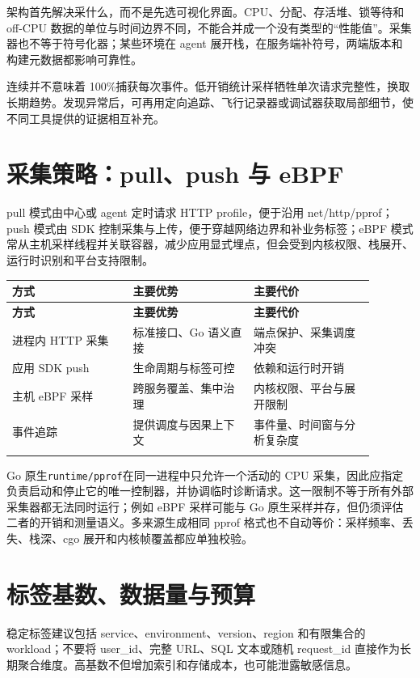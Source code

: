 \documentclass[UTF8,fontset=fandol,openany,11pt]{ctexbook}
\begin{document}
架构首先解决采什么，而不是先选可视化界面。CPU、分配、存活堆、锁等待和 off-CPU 数据的单位与时间边界不同，不能合并成一个没有类型的“性能值”。采集器也不等于符号化器；某些环境在 agent 展开栈，在服务端补符号，两端版本和构建元数据都影响可靠性。

连续并不意味着 100\%捕获每次事件。低开销统计采样牺牲单次请求完整性，换取长期趋势。发现异常后，可再用定向追踪、飞行记录器或调试器获取局部细节，使不同工具提供的证据相互补充。

\section{采集策略：pull、push 与 eBPF}
pull 模式由中心或 agent 定时请求 HTTP profile，便于沿用 net/http/pprof；push 模式由 SDK 控制采集与上传，便于穿越网络边界和补业务标签；eBPF 模式常从主机采样线程并关联容器，减少应用显式埋点，但会受到内核权限、栈展开、运行时识别和平台支持限制。

\begingroup\small\setlength{\tabcolsep}{4pt}
\begin{longtable}{>{\raggedright\arraybackslash}p{0.298\linewidth}>{\raggedright\arraybackslash}p{0.298\linewidth}>{\raggedright\arraybackslash}p{0.298\linewidth}}
\toprule
\textbf{方式} & \textbf{主要优势} & \textbf{主要代价} \\
\midrule
\endfirsthead
\toprule
\textbf{方式} & \textbf{主要优势} & \textbf{主要代价} \\
\midrule
\endhead
进程内 HTTP 采集 & 标准接口、Go 语义直接 & 端点保护、采集调度冲突 \\
\addlinespace[3pt]
应用 SDK push & 生命周期与标签可控 & 依赖和运行时开销 \\
\addlinespace[3pt]
主机 eBPF 采样 & 跨服务覆盖、集中治理 & 内核权限、平台与展开限制 \\
\addlinespace[3pt]
事件追踪 & 提供调度与因果上下文 & 事件量、时间窗与分析复杂度 \\
\addlinespace[3pt]
\bottomrule
\end{longtable}
\endgroup
Go 原生\texttt{runtime/\allowbreak{}pprof}在同一进程中只允许一个活动的 CPU 采集，因此应指定负责启动和停止它的唯一控制器，并协调临时诊断请求。这一限制不等于所有外部采集器都无法同时运行；例如 eBPF 采样可能与 Go 原生采样并存，但仍须评估二者的开销和测量语义。\cite{tools-pprof}多来源生成相同 pprof 格式也不自动等价：采样频率、丢失、栈深、cgo 展开和内核帧覆盖都应单独校验。

\section{标签基数、数据量与预算}
稳定标签建议包括 service、environment、version、region 和有限集合的 workload；不要将 user\_id、完整 URL、SQL 文本或随机 request\_id 直接作为长期聚合维度。高基数不但增加索引和存储成本，也可能泄露敏感信息。
\end{document}
